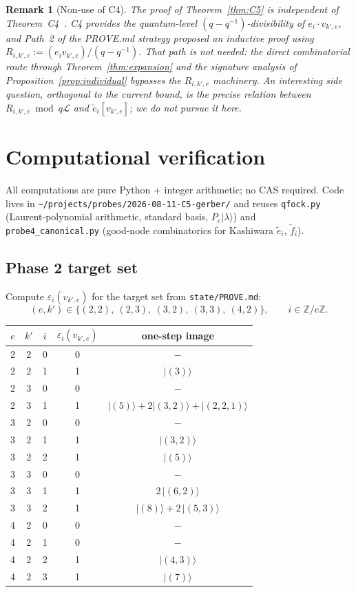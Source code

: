 \documentclass[11pt]{article}
\newtheorem{remark}[theorem]{Remark}
\theoremstyle{definition}
\newcommand{\vke}{v_{k',e}}
\newcommand{\ZZ}{\mathbb{Z}}
\newcommand{\Lcr}{\mathcal{L}}
\newcommand{\ee}{\tilde e}
\newcommand{\ff}{\tilde f}
\newcommand{\eps}{\varepsilon}
\begin{document}
\begin{remark}[Non-use of C4]\label{rmk:no-C4}
The proof of Theorem~\ref{thm:C5} is independent of
Theorem~C4~\cite{Clio-C4-2026-08-14}. C4 provides the quantum-level
$(q - q^{-1})$-divisibility of $e_i \cdot \vke$, and Path~2 of the PROVE.md
strategy proposed an inductive proof using $R_{i, k', e} := (e_i \vke)/(q-q^{-1})$.
That path is not needed: the direct combinatorial route through
Theorem~\ref{thm:expansion} and the signature analysis of
Proposition~\ref{prop:individual} bypasses the $R_{i,k',e}$ machinery.
An interesting side question, orthogonal to the current bound, is the
precise relation between $R_{i,k',e} \bmod q\Lcr$ and $\ee_i[\vke]$; we do
not pursue it here.
\end{remark}

\section{Computational verification}\label{sec:verification}

All computations are pure Python + integer arithmetic; no CAS required.
Code lives in \verb|~/projects/probes/2026-08-11-C5-gerber/| and reuses
\verb|qfock.py| (Laurent-polynomial arithmetic, standard basis,
$P_e |\lambda\rangle$) and \verb|probe4_canonical.py| (good-node
combinatorics for Kashiwara $\ee_i$, $\ff_i$).

\subsection{Phase 2 target set}

Compute $\eps_i(\vke)$ for the target set from
\verb|state/PROVE.md|:
\[
  (e, k') \in \{(2,2),\ (2,3),\ (3,2),\ (3,3),\ (4,2)\}, \qquad i \in \ZZ/e\ZZ.
\]

\begin{center}
\begin{tabular}{ccccc}
\toprule
$e$ & $k'$ & $i$ & $\eps_i(\vke)$ & one-step image \\
\midrule
2 & 2 & 0 & 0 & $-$ \\
2 & 2 & 1 & 1 & $|(3)\rangle$ \\
2 & 3 & 0 & 0 & $-$ \\
2 & 3 & 1 & 1 & $|(5)\rangle + 2|(3,2)\rangle + |(2,2,1)\rangle$ \\
3 & 2 & 0 & 0 & $-$ \\
3 & 2 & 1 & 1 & $|(3,2)\rangle$ \\
3 & 2 & 2 & 1 & $|(5)\rangle$ \\
3 & 3 & 0 & 0 & $-$ \\
3 & 3 & 1 & 1 & $2\,|(6,2)\rangle$ \\
3 & 3 & 2 & 1 & $|(8)\rangle + 2\,|(5,3)\rangle$ \\
4 & 2 & 0 & 0 & $-$ \\
4 & 2 & 1 & 0 & $-$ \\
4 & 2 & 2 & 1 & $|(4,3)\rangle$ \\
4 & 2 & 3 & 1 & $|(7)\rangle$ \\
\bottomrule
\end{tabular}
\end{center}
\end{document}
